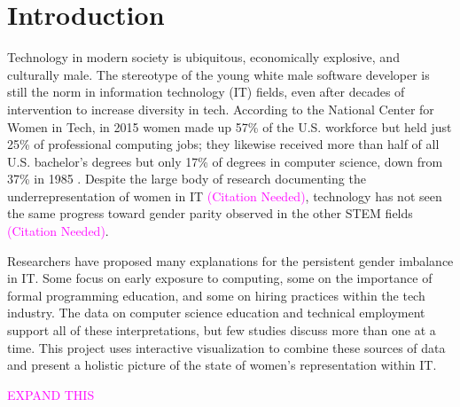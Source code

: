 \documentclass{article}
\newcommand{\bigmargins}{\vspace*{0.5in}}
\begin{document}
\bigmargins
\setcounter{page}{1}
\tableofcontents
\clearpage


\bigmargins
\section{Introduction}
Technology in modern society is ubiquitous, economically explosive, and culturally male. The stereotype of the young white male software developer is still the norm in information technology (IT) fields, even after decades of intervention to increase diversity in tech. According to the National Center for Women in Tech, in 2015 women made up 57\% of the U.S. workforce but held just 25\% of professional computing jobs; they likewise received more than half of all U.S. bachelor's degrees but only 17\% of degrees in computer science, down from 37\% in 1985 \citep{NCWIT2016Women}. Despite the large body of research documenting the underrepresentation of women in IT \textcolor{magenta}{(Citation Needed)}, technology has not seen the same progress toward gender parity observed in the other STEM fields \textcolor{magenta}{(Citation Needed)}. %

Researchers have proposed many explanations for the persistent gender imbalance in IT\@. Some focus on early exposure to computing, some on the importance of formal programming education, and some on hiring practices within the tech industry. The data on computer science education and technical employment support all of these interpretations, but few studies discuss more than one at a time. This project uses interactive visualization to combine these sources of data and present a holistic picture of the state of women's representation within IT\@.

\textcolor{Magenta}{EXPAND THIS} %











\clearpage
\bigmargins


\end{document}
